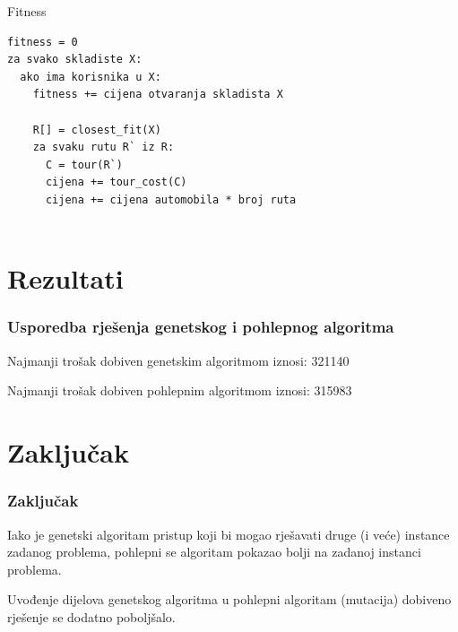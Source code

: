 \documentclass[utf8]{beamer}
\begin{document}
\begin{frame}[fragile]{Fitness}
\begin{lstlisting}
fitness = 0
za svako skladiste X:
  ako ima korisnika u X:
    fitness += cijena otvaranja skladista X
    
    R[] = closest_fit(X)
    za svaku rutu R` iz R:
      C = tour(R`)
      cijena += tour_cost(C)
      cijena += cijena automobila * broj ruta
      
\end{lstlisting}
\end{frame}

\section{Rezultati}
\begin{frame}
\frametitle{Usporedba rješenja genetskog i pohlepnog algoritma}

Najmanji trošak dobiven genetskim algoritmom iznosi: 321140

\vspace{5mm}

Najmanji trošak dobiven pohlepnim algoritmom iznosi: 315983

\end{frame}

\section{Zaključak}
\begin{frame}
\frametitle{Zaključak}
Iako je genetski algoritam pristup koji bi mogao rješavati druge (i veće) instance zadanog problema, pohlepni se algoritam pokazao bolji na zadanoj instanci problema.

\vspace{5mm}

Uvođenje dijelova genetskog algoritma u pohlepni algoritam (mutacija) dobiveno rješenje se dodatno poboljšalo.

\end{frame}
\end{document}
